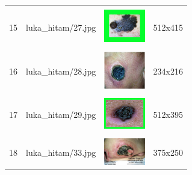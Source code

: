 \begin{table}[H]
\begin{tabular}{|m{0.2in}|m{1.2in}|m{0.7in}|m{0.7in}|}
		& &  &  \\
		15 & 
		luka\_hitam/27.jpg &
		\includegraphics[width=0.7in]{gambar/dataset_citra/luka_hitam/bahan/27.jpg}&
		512x415\\
		\hline
		
		& &  &  \\
		16 & 
		luka\_hitam/28.jpg &
		\includegraphics[width=0.7in]{gambar/dataset_citra/luka_hitam/bahan/28.jpg}&
		234x216\\
		\hline
		
		& &  &  \\
		17 & 
		luka\_hitam/29.jpg &
		\includegraphics[width=0.7in]{gambar/dataset_citra/luka_hitam/bahan/29.jpg}&
		512x395\\
		\hline
	
		& &  &  \\
		18& 
		luka\_hitam/33.jpg &
		\includegraphics[width=0.7in]{gambar/dataset_citra/luka_hitam/bahan/33.jpg}&
		375x250\\
		\hline

	\end{tabular}
\end{table}

